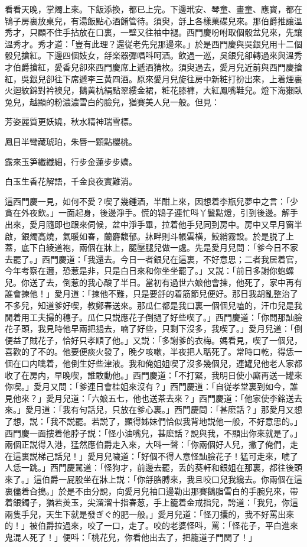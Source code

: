 看看天晚，掌燭上來。下飯添換，都已上完。下邊玳安、琴童、畫童、應寳，都在鴇子房裏放桌兒，有湯飯點心酒餚管待。須臾，㧱上各樣菓碟兒來。那伯爵推讓溫秀才，只顧不住手拈放在口裏，一壁又往袖中褪。西門慶吩咐取個骰盆兒來，先讓溫秀才。秀才道：「豈有此理？還従老先兒那邊來。」於是西門慶與吳銀兒用十二個骰兒搶紅。下邊四個妓女，㧱楽器彈唱呌呵酒。飲過一巡，吳銀兒卻轉過來與溫秀才伯爵搶紅，愛香兒卻來西門慶席上遞酒猜枚。須臾過去，愛月兒近前與西門慶搶紅，吳銀兒卻往下席遞李三黄四酒。原來愛月兒旋往房中新粧打扮出來，上着煙裏火迴紋錦對衿襖兒，鵝黄杭絹點翠縷金裙，粧花膝褲，大紅鳳嘴鞋兒。燈下海獺臥兔兒，越顯的粉濃濃雪白的臉兒，猶賽美人兒一般。但見：

\begin{myquote}
芳姿麗質更妖嬈，秋水精神瑞雪標。

鳳目半彎藏琥珀，朱唇一顆點櫻桃。

露來玉笋纖纖細，行步金蓮步步嬌。

白玉生香花解語，千金良夜實難消。
\end{myquote}

這西門慶一見，如何不愛？喫了幾鍾酒，半酣上來，因想着李瓶兒夢中之言：「少貪在外夜飲。」一面起身，後邊淨手。慌的鴇子連忙呌丫鬟點燈，引到後邊。解手出來，愛月隨即也跟來伺候，盆中淨手畢，拉着他手兒同到房中。房中又早月窗半啟，銀燭高燒，氣暖如春，蘭麝馥郁。牀畔則斗帳雲横，鮫綃霧設。於是脱了上蓋，底下白綾道袍，兩個在牀上，腿壓腿兒做一處。先是愛月兒問：「爹今日不家去罷了。」西門慶道：「我還去。今日一者銀兒在這裏，不好意思；二者我居着官，今年考察在邇，恐惹是非，只是白日來和你坐坐罷了。」又説：「前日多謝你蚫螺兒。你送了去，倒惹的我心酸了半日。當初有過世六娘他會揀，他死了，家中再有誰會揀他！」愛月道：「揀他不難，只是要㧱的着筋節兒便好。那日我胡亂整治了不多兒，知道爹好喫，教鄭春送來。那瓜仁都是我口裏一個個兒嗑的，汗巾兒是我閒着用工夫撮的穗子。瓜仁只説應花子倒撾了好些喫了。」西門慶道：「你問那訕臉花子頭，我見時他早兩把撾去，喃了好些，只剩下沒多，我喫了。」愛月兒道：「倒便益了賊花子，恰好只孝順了他。」又説：「多謝爹的衣梅。媽看見，喫了一個兒，喜歡的了不的。他要便痰火發了，晚夕咳嗽，半夜把人聒死了。常時口乾，得恁一個在口内噙着，他倒生好些津液。我和俺姐姐喫了沒多幾個兒，連罐兒他老人家都收了在房内，早晚喫，誰敢動他。」西門慶道：「不打緊，我明日使小廝再送一罐來你喫。」愛月又問：「爹連日會桂姐來沒有？」西門慶道：「自従孝堂裏到如今，誰見他來？」愛月兒道：「六娘五七，他也送茶去來？」西門慶道：「他家使李銘送去來。」愛月道：「我有句話兒，只放在爹心裏。」西門慶問：「甚麽話？」那愛月又想了想，説：「我不説罷。若説了，顯得姊妹們恰似我背地説他一般，不好意思的。」西門慶一面摟着他脖子説：「怪小油嘴兒，甚麽話？說與我，不顯出你來就是了。」　兩個正説得入港，猛然應伯爵走入來，大呌一聲：「你兩個好人兒，撇了俺們，走在這裏説梯己話兒！」愛月兒噦道：「好個不得人意怪訕臉花子！猛可走來，唬了人恁一跳。」西門慶駡道：「怪狗才，前邊去罷，丢的葵軒和銀姐在那裏，都往後頭來了。」這伯爵一屁股坐在牀上説：「你㧱胳膊來，我且咬口兒我纔去。你兩個在這裏儘着㒲搗。」於是不由分說，向愛月兒袖口邊勒出那賽鵝脂雪白的手腕兒來，帶着銀鐲子，猶若羙玉，尖溜溜十指春葱，手上籠着金戒指兒，誇道：「我兒，你這兩隻手兒，天生下就是發ぎぐ的肥一般。」愛月兒道：「怪刀攮的，我不好罵出來的！」被伯爵拉過來，咬了一口，走了。咬的老婆怪呌，罵：「怪花子，平白進來鬼混人死了！」便呌：「桃花兒，你看他出去了，把籠道子門関了！」


